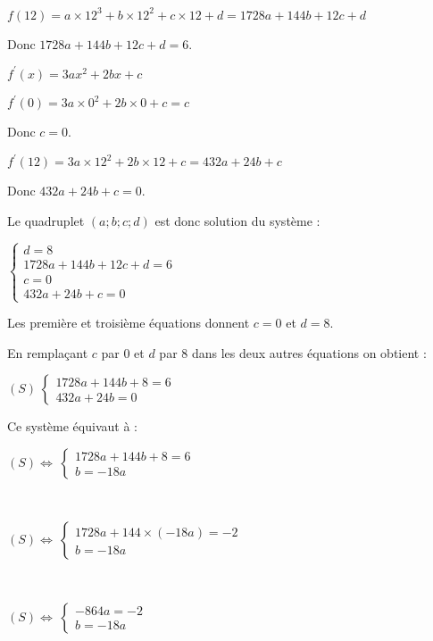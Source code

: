      $f(12)=a\times 12^3+b \times 12^2+c \times 12+d$$=1728a+144b+12c+d$
     \par
     Donc  $1728a+144b+12c+d=6$.
     \par
     $f ^{\prime}(x)=3ax^2+2bx+c$
     \par
     $f ^{\prime}(0)=3a \times 0^2+2b \times 0+c=c$
     \par
     Donc $c=0$.
     \par
     $f ^{\prime}(12)=3a \times 12^2+2b \times 12+c=432a+24b+c$
     \par
     Donc $432a+24b+c=0$.
     \par
     Le quadruplet $(a;b;c;d)$ est donc solution du système :
     \par
     $\begin{cases}  d=8 \\ 1728a+144b+12c+d=6 \\ c=0 \\   432a+24b+c=0 \end{cases}$
     \item
     Les première et troisième équations donnent $c=0$ et $d=8$.
     \par
     En remplaçant $c$ par $0$ et $d$ par $8$ dans les deux autres équations on obtient :
     \par
     $(S) \ \begin{cases} 1728a+144b+8=6 \\ 432a+24b=0  \end{cases}$
     \par
     Ce système équivaut à :
     \par
     $(S) \Leftrightarrow \ \begin{cases} 1728a+144b+8=6 \\ b=-18a  \end{cases}$~
     \par
     ~
     \par
     $(S) \Leftrightarrow \ \begin{cases} 1728a+144 \times (-18a)=-2 \\ b=-18a  \end{cases}$~
     \par
     ~
     \par
     $(S) \Leftrightarrow \ \begin{cases} -864a=-2 \\ b=-18a  \end{cases}$ ~
     \par
     ~
     \par
$$
